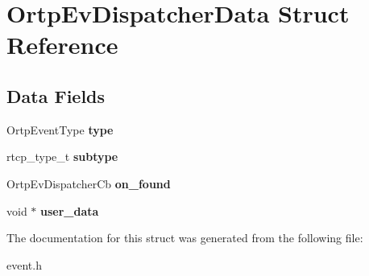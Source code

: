 \section{Ortp\+Ev\+Dispatcher\+Data Struct Reference}
\label{structOrtpEvDispatcherData}
\subsection*{Data Fields}
\begin{DoxyCompactItemize}
\item 
\mbox{\label{structOrtpEvDispatcherData_a1ed4721a5aec3b57d3a572cbe925eef1}} 
Ortp\+Event\+Type {\bfseries type}
\item 
\mbox{\label{structOrtpEvDispatcherData_a450f08d0ba5adb540d8b9ef1d8267dc9}} 
rtcp\+\_\+type\+\_\+t {\bfseries subtype}
\item 
\mbox{\label{structOrtpEvDispatcherData_a1f2bd62ebe963380165bb2087973b0a9}} 
Ortp\+Ev\+Dispatcher\+Cb {\bfseries on\+\_\+found}
\item 
\mbox{\label{structOrtpEvDispatcherData_aa928c3181c80b3d1ef055b743a36b847}} 
void $\ast$ {\bfseries user\+\_\+data}
\end{DoxyCompactItemize}


The documentation for this struct was generated from the following file\+:\begin{DoxyCompactItemize}
\item 
event.\+h\end{DoxyCompactItemize}
